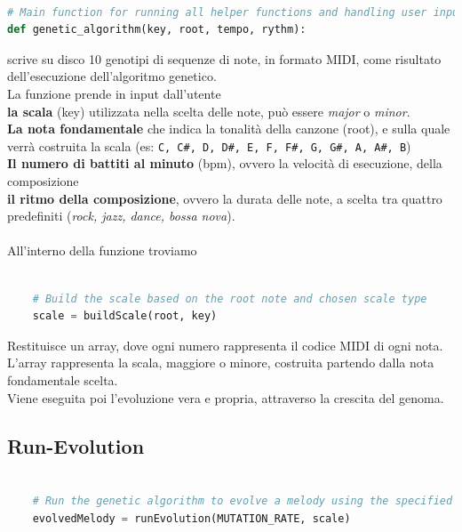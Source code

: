 \documentclass[a4paper,12pt]{report}
\begin{document}
\begin{lstlisting}[language=Python]
 
# Main function for running all helper functions and handling user input.
def genetic_algorithm(key, root, tempo, rythm):

\end{lstlisting}

scrive su disco 10 genotipi di sequenze di note, in formato MIDI, come risultato dell'esecuzione dell'algoritmo genetico. \\
La funzione prende in input dall'utente \\
\textbf{la scala} (key) utilizzata nella scelta delle note, può essere \textit{major} o \textit{minor}. \\
\textbf{La nota fondamentale} che indica la tonalità della canzone (root), e sulla quale verrà costruita la scala (es: \texttt{C, C#, D, D#, E, F, F#, G, G#, A, A#, B}) \\
\textbf{Il numero di battiti al minuto} (bpm), ovvero la velocità di esecuzione, della composizione \\
\textbf{il ritmo della composizione}, ovvero la durata delle note, a scelta tra quattro predefiniti (\textit{rock, jazz, dance, bossa nova}). \\
\\
All'interno della funzione troviamo 

\begin{lstlisting}[language=Python]

    # Build the scale based on the root note and chosen scale type
    scale = buildScale(root, key)

\end{lstlisting}

Restituisce un array, dove ogni numero rappresenta il codice MIDI di ogni nota. \\
L'array rappresenta la scala, maggiore o minore, costruita partendo dalla nota fondamentale scelta. \\
Viene eseguita poi l'evoluzione vera e propria, attraverso la crescita del genoma.

\subsection{Run-Evolution}

\begin{lstlisting}[language=Python]

    # Run the genetic algorithm to evolve a melody using the specified mutation rate and scale
    evolvedMelody = runEvolution(MUTATION_RATE, scale)

\end{lstlisting}
\end{document}
